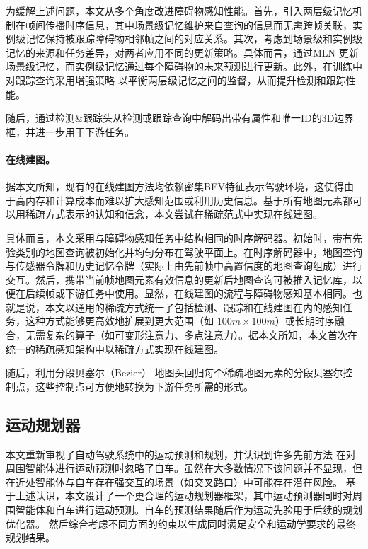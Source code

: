 为缓解上述问题，本文从多个角度改进障碍物感知性能。首先，引入两层级记忆机制在帧间传播时序信息，其中场景级记忆维护来自查询的信息而无需跨帧关联，实例级记忆保持被跟踪障碍物相邻帧之间的对应关系。其次，考虑到场景级和实例级记忆的来源和任务差异，对两者应用不同的更新策略。具体而言，通过MLN \cite{wang2023exploring} 更新场景级记忆，而实例级记忆通过每个障碍物的未来预测进行更新。此外，在训练中对跟踪查询采用增强策略 \cite{zeng2022motr} 以平衡两层级记忆之间的监督，从而提升检测和跟踪性能。

随后，通过检测\&跟踪头从检测或跟踪查询中解码出带有属性和唯一ID的3D边界框，并进一步用于下游任务。

\paragraph{\textbf{在线建图。}} 据本文所知，现有的在线建图方法均依赖密集BEV特征表示驾驶环境，这使得由于高内存和计算成本而难以扩大感知范围或利用历史信息。基于所有地图元素都可以用稀疏方式表示的认知和信念，本文尝试在稀疏范式中实现在线建图。

具体而言，本文采用与障碍物感知任务中结构相同的时序解码器。初始时，带有先验类别的地图查询被初始化并均匀分布在驾驶平面上。在时序解码器中，地图查询与传感器令牌和历史记忆令牌（实际上由先前帧中高置信度的地图查询组成）进行交互。然后，携带当前帧地图元素有效信息的更新后地图查询可被推入记忆库，以便在后续帧或下游任务中使用。显然，在线建图的流程与障碍物感知基本相同。也就是说，本文以通用的稀疏方式统一了包括检测、跟踪和在线建图在内的感知任务，这种方式能够更高效地扩展到更大范围（如 $100m\times100m$）或长期时序融合，无需复杂的算子（如可变形注意力\cite{zhu2020deformable}、多点注意力\cite{yuan2024streammapnet}）。据本文所知，本文首次在统一的稀疏感知架构中以稀疏方式实现在线建图。

随后，利用分段贝塞尔（Bezier）\cite{qiao2023end} 地图头回归每个稀疏地图元素的分段贝塞尔控制点，这些控制点可方便地转换为下游任务所需的形式。

\subsection{运动规划器}
\label{sec:motion_planner}

本文重新审视了自动驾驶系统中的运动预测和规划，并认识到许多先前方法 \cite{shi2024mtr++, zhou2022hivt} 在对周围智能体进行运动预测时忽略了自车。虽然在大多数情况下该问题并不显现，但在近处智能体与自车存在强交互的场景（如交叉路口）中可能存在潜在风险。
基于上述认识，本文设计了一个更合理的运动规划器框架，其中运动预测器同时对周围智能体和自车进行运动预测。自车的预测结果随后作为运动先验用于后续的规划优化器。
然后综合考虑不同方面的约束以生成同时满足安全和运动学要求的最终规划结果。

